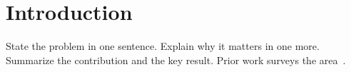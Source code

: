 \section{Introduction}\label{sec:intro}

State the problem in one sentence.
Explain why it matters in one more.
Summarize the contribution and the key result.
Prior work surveys the area~\cite{nickel2016review}.
